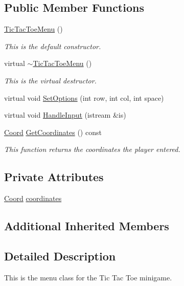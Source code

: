 \subsection*{Public Member Functions}
\begin{DoxyCompactItemize}
\item 
\hyperlink{classTicTacToeMenu_a15e92bc5e44266bbc23bbce421186dad}{Tic\-Tac\-Toe\-Menu} ()
\begin{DoxyCompactList}\small\item\em This is the default constructor. \end{DoxyCompactList}\item 
virtual \hyperlink{classTicTacToeMenu_a429d4d036694b8d96b08896f50d5f19b}{$\sim$\-Tic\-Tac\-Toe\-Menu} ()
\begin{DoxyCompactList}\small\item\em This is the virtual destructor. \end{DoxyCompactList}\item 
virtual void \hyperlink{classTicTacToeMenu_ab736aba3ecb23a6b28cde04729556088}{Set\-Options} (int row, int col, int space)
\item 
virtual void \hyperlink{classTicTacToeMenu_a11191814019309260bb4270c03891e5e}{Handle\-Input} (istream \&is)
\item 
\hyperlink{structTicTacToeMenu_1_1Coord}{Coord} \hyperlink{classTicTacToeMenu_aa5e3c3bbfe2765700c036bbd055156e8}{Get\-Coordinates} () const 
\begin{DoxyCompactList}\small\item\em This function returns the coordinates the player entered. \end{DoxyCompactList}\end{DoxyCompactItemize}
\subsection*{Private Attributes}
\begin{DoxyCompactItemize}
\item 
\hyperlink{structTicTacToeMenu_1_1Coord}{Coord} \hyperlink{classTicTacToeMenu_a80887137031e237b126b2c36b377b2dd}{coordinates}
\end{DoxyCompactItemize}
\subsection*{Additional Inherited Members}


\subsection{Detailed Description}
This is the menu class for the Tic Tac Toe minigame. 

